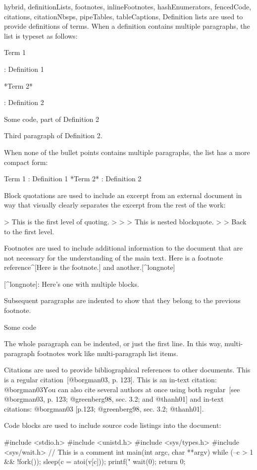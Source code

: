 \documentclass[
  digital,     %
  oneside,     %
  nosansbold,  %
  nocolorbold, %
  lof,         %
  lot,         %
]{fithesis4}
\begin{document}
\begin{markdown*}{%
  hybrid,
  definitionLists,
  footnotes,
  inlineFootnotes,
  hashEnumerators,
  fencedCode,
  citations,
  citationNbsps,
  pipeTables,
  tableCaptions,
}
Definition lists are used to provide definitions of terms. When
a definition contains multiple paragraphs, the list is typeset
as follows:

Term 1

:   Definition 1

*Term 2*

:   Definition 2

        Some code, part of Definition 2

    Third paragraph of Definition 2.

When none of the bullet points contains multiple paragraphs, the
list has a more compact form:

Term 1
:   Definition 1
*Term 2*
:   Definition 2

Block quotations are used to include an excerpt from an external
document in way that visually clearly separates the excerpt from
the rest of the work:

> This is the first level of quoting.
>
> > This is nested blockquote.
>
> Back to the first level.

Footnotes are used to include additional information to the
document that are not necessary for the understanding of the main
text. Here is a footnote reference^[Here is the footnote.] and
another.[^longnote]

[^longnote]: Here's one with multiple blocks.

    Subsequent paragraphs are indented to show that they
belong to the previous footnote.

        Some code

    The whole paragraph can be indented, or just the first
    line.  In this way, multi-paragraph footnotes work like
    multi-paragraph list items.

Citations are used to provide bibliographical references to other
documents. This is a regular citation~[@borgman03, p. 123]. This is
an in-text citation: @borgman03\. You can also cite several authors
at once using both regular~[see @borgman03, p. 123; @greenberg98,
sec.  3.2; and @thanh01] and in-text citations: @borgman03 [p.123;
@greenberg98, sec. 3.2; @thanh01].

Code blocks are used to include source code listings into the
document:

    #include <stdio.h>
    #include <unistd.h>
    #include <sys/types.h>
    #include <sys/wait.h>
    // This is a comment
    int main(int argc, char **argv)
    {
        while (--c > 1 && !fork());
        sleep(c = atoi(v[c]));
        printf("%
        wait(0);
        return 0;
    }


\end{markdown*}
\end{document}
